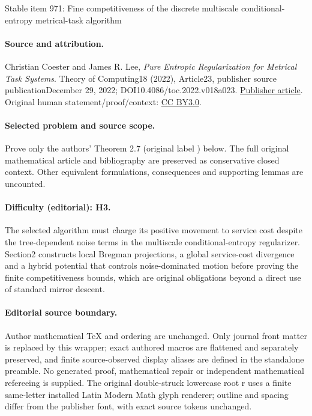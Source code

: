 \documentclass[11pt]{article}
\numberwithin{equation}{section}
\theoremstyle{definition}
\theoremstyle{plain}
\begin{document}
\begin{center}{\Large Stable item 971: Fine competitiveness of the discrete multiscale conditional-entropy metrical-task algorithm}\end{center}
\paragraph{Source and attribution.}
Christian Coester and James R. Lee, \emph{Pure Entropic Regularization for Metrical Task Systems}. Theory of Computing18 (2022), Article23, publisher source publicationDecember 29, 2022; DOI10.4086/toc.2022.v018a023. \href{https://theoryofcomputing.org/articles/v018a023/}{Publisher article}. Original human statement/proof/context: \href{https://creativecommons.org/licenses/by/3.0/}{CC BY3.0}.
\paragraph{Selected problem and source scope.}
Prove only the authors' Theorem 2.7 (original label ) below. The full original mathematical article and bibliography are preserved as conservative closed context. Other equivalent formulations, consequences and supporting lemmas are uncounted.
\paragraph{Difficulty (editorial): H3.}
The selected algorithm must charge its positive movement to service cost despite the tree-dependent noise terms in the multiscale conditional-entropy regularizer. Section2 constructs local Bregman projections, a global service-cost divergence and a hybrid potential that controls noise-dominated motion before proving the finite competitiveness bounds, which are original obligations beyond a direct use of standard mirror descent.
\paragraph{Editorial source boundary.}
Author mathematical TeX and ordering are unchanged. Only journal front matter is replaced by this wrapper; exact authored macros are flattened and separately preserved, and finite source-observed display aliases are defined in the standalone preamble. No generated proof, mathematical repair or independent mathematical refereeing is supplied. The original double-struck lowercase root r uses a finite same-letter installed Latin Modern Math glyph renderer; outline and spacing differ from the publisher font, with exact source tokens unchanged.
\clearpage
\end{document}
